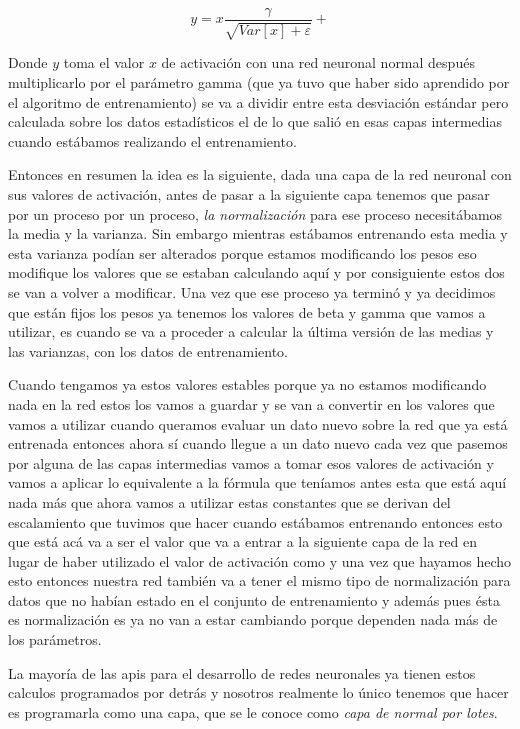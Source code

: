 \begin{equation}
 y = x \dfrac{\gamma}{\sqrt{Var[x]+\varepsilon} } + %
\end{equation}

Donde $y$ toma el valor $x$ de activación con una red neuronal normal después multiplicarlo por el parámetro gamma (que ya tuvo que haber sido aprendido por el algoritmo de entrenamiento) se va a dividir entre esta desviación estándar pero calculada sobre los datos estadísticos el de lo que salió en esas capas intermedias cuando estábamos realizando el entrenamiento. 

Entonces en resumen la idea es la siguiente, dada  una capa de la red neuronal con sus valores de activación, antes de pasar a la siguiente capa tenemos que pasar por un proceso por un proceso, \textit{la normalización} para ese proceso necesitábamos la media y la varianza. Sin embargo mientras estábamos entrenando esta media y esta varianza podían ser alterados porque estamos modificando los pesos eso modifique los valores que se estaban calculando aquí y por consiguiente  estos dos se van a volver a modificar. Una vez que ese proceso ya terminó y ya decidimos que están fijos los pesos ya tenemos los valores de beta y gamma que vamos a utilizar, es cuando se va a proceder a calcular  la última versión de las medias y las varianzas, con los datos de entrenamiento. 

Cuando tengamos ya estos valores estables porque ya no estamos modificando nada en la red estos los vamos a guardar y se van a convertir en los valores que vamos a utilizar cuando queramos evaluar un dato nuevo sobre la red que ya está entrenada entonces ahora sí cuando llegue a un dato nuevo cada vez que pasemos por alguna de las capas intermedias vamos a tomar esos valores de activación y vamos a aplicar lo equivalente a la fórmula que teníamos antes esta que está aquí nada más que ahora vamos a utilizar estas constantes que se derivan del escalamiento que tuvimos que hacer cuando estábamos entrenando entonces esto que está acá va a ser el valor que va a entrar a la siguiente capa de la red en lugar de haber utilizado el valor de activación como y una vez que hayamos hecho esto entonces nuestra red también va a tener el mismo tipo de normalización para datos que no habían estado en el conjunto de entrenamiento y además pues ésta es normalización es ya no van a estar cambiando porque dependen nada más de los parámetros. 

La mayoría de las apis para el desarrollo de redes neuronales ya tienen estos calculos programados por detrás y nosotros realmente lo único  tenemos que hacer es programarla como una capa, que se le conoce como \textit{capa de normal por lotes}. 

